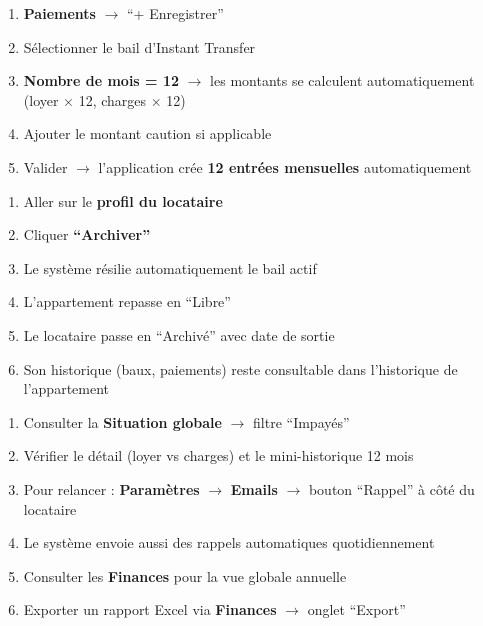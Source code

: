 \documentclass[12pt,a4paper]{article}
\begin{document}
\begin{flowbox}
\begin{enumerate}
\item \textbf{Paiements} $\rightarrow$ ``+ Enregistrer''
\item S\'electionner le bail d'Instant Transfer
\item \textbf{Nombre de mois = 12} $\rightarrow$ les montants se calculent automatiquement (loyer $\times$ 12, charges $\times$ 12)
\item Ajouter le montant caution si applicable
\item Valider $\rightarrow$ l'application cr\'ee \textbf{12 entr\'ees mensuelles} automatiquement
\end{enumerate}
\end{flowbox}

\begin{flowbox}
\begin{enumerate}
\item Aller sur le \textbf{profil du locataire}
\item Cliquer \textbf{``Archiver''}
\item Le syst\`eme r\'esilie automatiquement le bail actif
\item L'appartement repasse en ``Libre''
\item Le locataire passe en ``Archiv\'e'' avec date de sortie
\item Son historique (baux, paiements) reste consultable dans l'historique de l'appartement
\end{enumerate}
\end{flowbox}

\begin{flowbox}
\begin{enumerate}
\item Consulter la \textbf{Situation globale} $\rightarrow$ filtre ``Impay\'es''
\item V\'erifier le d\'etail (loyer vs charges) et le mini-historique 12 mois
\item Pour relancer : \textbf{Param\`etres} $\rightarrow$ \textbf{Emails} $\rightarrow$ bouton ``Rappel'' \`a c\^ot\'e du locataire
\item Le syst\`eme envoie aussi des rappels automatiques quotidiennement
\item Consulter les \textbf{Finances} pour la vue globale annuelle
\item Exporter un rapport Excel via \textbf{Finances} $\rightarrow$ onglet ``Export''
\end{enumerate}
\end{flowbox}
\end{document}
